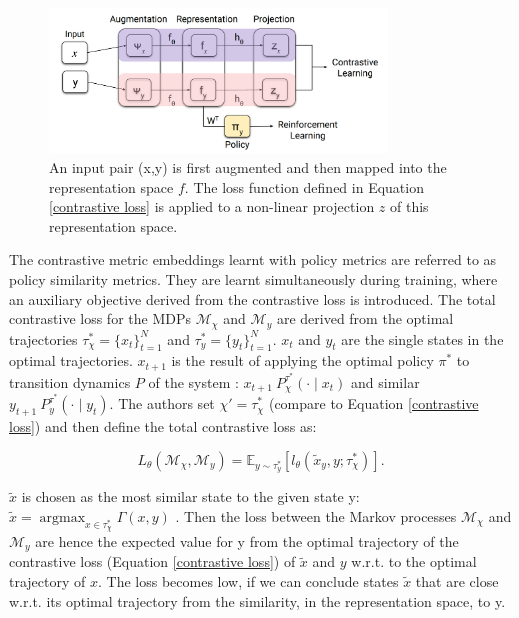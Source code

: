 \documentclass{usiinftr}
\DeclareMathOperator*{\argmax}{argmax}
\begin{document}
\begin{figure}[h]
\centering
\includegraphics[width = 0.8\textwidth]{figures/Learning_architecture.png}
\caption{\label{fig: Learning_Architecture}An input pair (x,y) is first augmented and then mapped into the representation space $f$. The loss function defined in Equation \ref{contrastive loss} is applied to a non-linear projection $z$ of this representation space. \cite{agarwal2021contrastive} }
\end{figure}

The contrastive metric embeddings learnt with policy metrics are referred to as policy similarity metrics. They are learnt simultaneously during training, where an auxiliary objective derived from the contrastive loss is introduced.
The total contrastive loss for the MDPs $\mathcal{M}_\chi$ and $\mathcal{M}_y$ are derived from the optimal trajectories $\tau_\chi^* = \{x_t\}_{t = 1}^N$ and $\tau_y^* = \{y_t\}_{t = 1}^N$.
$x_t$ and $y_t$ are the single states in the optimal trajectories. $x_{t+1}$ is the result of applying the optimal policy $\pi^*$ to transition dynamics $P$ of the system : $x_{t+1} ~P_\chi^{\tau^*} (\cdot \mid x_t)$ and similar
$y_{t+1} ~ P_y^{\tau^*} (\cdot \mid y_t)$.
The authors set $\chi' = \tau_\chi^*$ (compare to Equation \ref{contrastive loss}) and then define the total contrastive loss as:

\begin{equation}
L_\theta (\mathcal{M}_\chi, \mathcal{M}_y) = \mathbb{E}_{y \sim  \tau_y^*} [l_\theta (\tilde{x}_y, y;\tau_\chi^*)] . 
\end{equation}

$\tilde{x}$ is chosen as the most similar state to the given state y: $\tilde{x} = \argmax_{x \in \tau_\chi ^ *} \Gamma (x,y) $ . Then the loss between the Markov processes $\mathcal{M}_\chi$ and $\mathcal{M}_y$ are hence the expected value for y from the optimal trajectory of the contrastive loss (Equation  \ref{contrastive loss}) of $\tilde{x}$ and $y$ w.r.t. to the optimal trajectory of $x$.  The loss becomes low, if we can conclude states $\tilde{x}$ that are close w.r.t. its optimal trajectory from the similarity, in the representation space, to y. 
\end{document}
